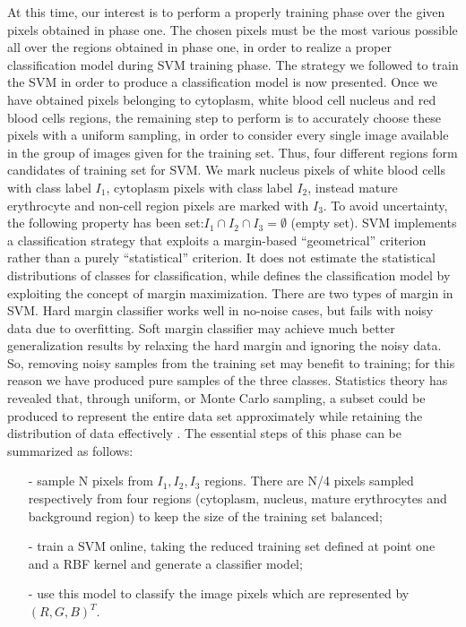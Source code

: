 \documentclass[final,a4paper,12pt,english]{UnicaPhdThesis3}
\begin{document}
At this time, our interest is to perform a properly training phase over the given pixels obtained in phase one. The chosen pixels must be the most various possible all over the regions obtained in phase one, in order to realize a proper classification model during SVM training phase. 
The strategy we followed to train the SVM in order to produce a classification model is now presented. Once we have obtained pixels belonging to cytoplasm, white blood cell nucleus and red blood cells regions, the remaining step to perform is to accurately choose these pixels with a uniform sampling, in order to consider every single image available in the group of images given for the training set.
Thus, four different regions form candidates of training set for SVM. We mark nucleus pixels of white blood cells with class label $I_1$, cytoplasm pixels with class label $I_2$, instead mature erythrocyte and non-cell region pixels are marked with $I_3$. To avoid uncertainty, the following property has been set:$ I_1\cap I_2 \cap I_3 = \emptyset$ (empty set). SVM implements a classification strategy that exploits a margin-based “geometrical” criterion rather than a purely “statistical” criterion. It does not estimate the statistical distributions of classes for classification, while defines the classification model by exploiting the concept of margin maximization. There are two types of margin in SVM. Hard margin classifier works well in no-noise cases, but fails with noisy data due to overfitting. Soft margin classifier may achieve much better generalization results by relaxing the hard margin and ignoring the noisy data. So, removing noisy samples from the training set may benefit to training; for this reason we have produced pure samples of the three classes. Statistics theory has revealed that, through uniform, or Monte Carlo sampling, a subset could be produced to represent the entire data set approximately while retaining the distribution of data effectively \cite{caflisch}.
The essential steps of this phase can be summarized as follows:
\begin{itemize}\itemsep3pt \parskip0pt 
	\item[-] sample N pixels from $ I_1, I_2, I_3$ regions. There are N/4 pixels sampled respectively from four regions (cytoplasm, nucleus, mature erythrocytes and background region) to keep the size of the training set balanced;
	\item[-] train a SVM online, taking the reduced training set defined at point one and a RBF kernel and generate a classifier model;
	\item[-] use this model to classify the image pixels which are represented by $(R,G,B)^T.$
\end{itemize}	
\end{document}
